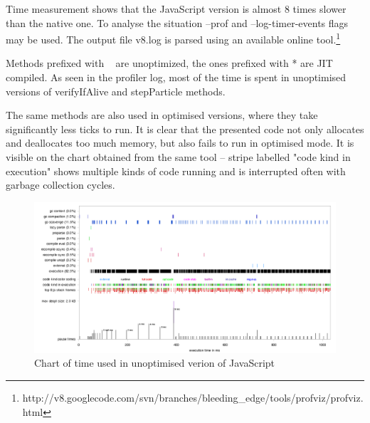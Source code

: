 


Time measurement shows that the JavaScript version is almost 8 times slower than the native one. To analyse the situation --prof and --log-timer-events flags may be used. The output file v8.log is parsed using an available online tool.\footnote{http://v8.googlecode.com/svn/branches/bleeding\_edge/tools/profviz/profviz.html}



Methods prefixed with ~ are unoptimized, the ones prefixed with * are JIT compiled. As seen in the profiler log, most of the time is spent in unoptimised versions of verifyIfAlive and stepParticle methods.



The same methods are also used in optimised versions, where they take significantly less ticks to run. It is clear that the presented code not only allocates and deallocates too much memory, but also fails to run in optimised mode. It is visible on the chart obtained from the same tool -- stripe labelled "code kind in execution" shows multiple kinds of code running and is interrupted often with garbage collection cycles.

\begin{figure}[h!]
  \caption{Chart of time used in unoptimised verion of JavaScript}
  \label{img:particles1profile}
  \centering
	\includegraphics[width=16cm]{particles/particles1-profile.png}
\end{figure}

